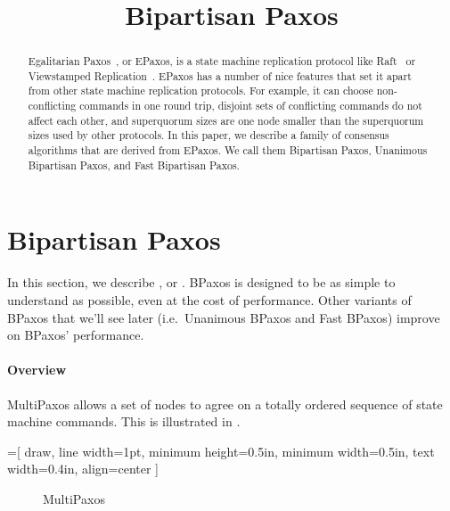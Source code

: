 \documentclass{mwhittaker}
\title{Bipartisan Paxos}
\theoremstyle{definition}
\begin{document}
\maketitle

\begin{abstract}
  Egalitarian Paxos~\cite{moraru2013there}, or EPaxos, is a state machine
  replication protocol like Raft~\cite{ongaro2014search} or Viewstamped
  Replication~\cite{liskov2012viewstamped}. EPaxos has a number of nice features
  that set it apart from other state machine replication protocols. For example,
  it can choose non-conflicting commands in one round trip, disjoint sets of
  conflicting commands do not affect each other, and superquorum sizes are one
  node smaller than the superquorum sizes used by other protocols.
  In this paper, we describe a family of consensus algorithms that are derived
  from EPaxos. We call them Bipartisan Paxos, Unanimous Bipartisan Paxos, and
  Fast Bipartisan Paxos.
\end{abstract}

\section{Bipartisan Paxos}
In this section, we describe , or .
BPaxos is designed to be as simple to understand as possible, even at the cost
of performance. Other variants of BPaxos that we'll see later (i.e.\ Unanimous
BPaxos and Fast BPaxos) improve on BPaxos' performance.

\paragraph{Overview}
MultiPaxos allows a set of nodes to agree on a totally ordered sequence of
state machine commands. This is illustrated in .

=[%
  draw,
  line width=1pt,
  minimum height=0.5in,
  minimum width=0.5in,
  text width=0.4in,
  align=center
]
\begin{figure}[h]
  \centering
  \caption{MultiPaxos}
\end{figure}
\end{document}
